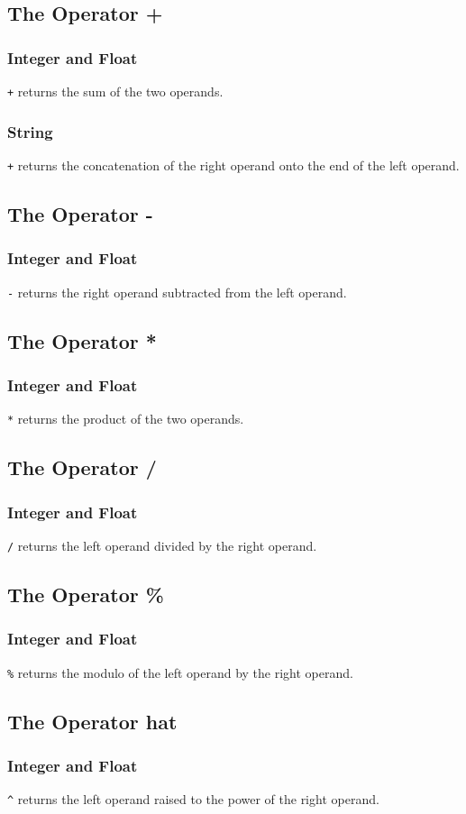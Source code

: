 \subsection{The Operator +}
\subsubsection{Integer and Float}
\verb!+! returns the sum of the two operands.
\subsubsection{String}
\verb!+! returns the concatenation of the right operand onto the end of the left operand.

\subsection{The Operator -}
\subsubsection{Integer and Float}
\verb!-! returns the right operand subtracted from the left operand.

\subsection{The Operator *}
\subsubsection{Integer and Float}
\verb!*! returns the product of the two operands.

\subsection{The Operator /}
\subsubsection{Integer and Float}
\verb!/! returns the left operand divided by the right operand.

\subsection{The Operator \%}
\subsubsection{Integer and Float}
\verb!%! returns the modulo of the left operand by the right operand.

\subsection{The Operator hat}
\subsubsection{Integer and Float}
\verb!^! returns the left operand raised to the power of the right operand.